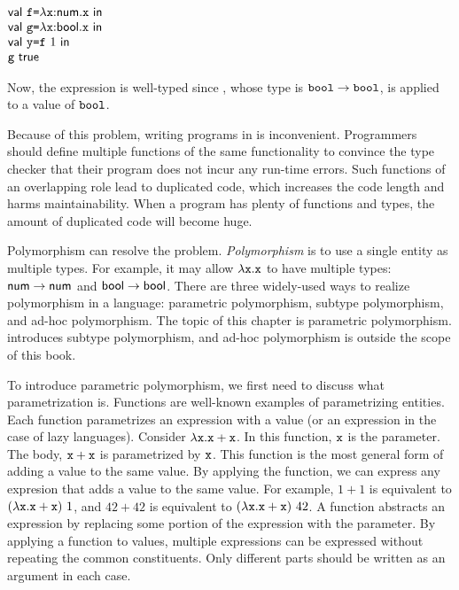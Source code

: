 $
  \begin{array}{@{}l}
    \ebind{\cf}{\efunt{\cx}{\tnum}{\cx}}{\\
    \ebind{\code{g}}{\efunt{\cx}{\tbool}{\cx}}{\\
    \ebind{\cy}{\cf\ 1}{\\
    \code{g}\ \textsf{true}
    }}}
  \end{array}
$

Now, the expression is well-typed since , whose type is
$\texttt{bool}\rightarrow\texttt{bool}$, is applied to a value of $\texttt{bool}$.

Because of this problem, writing programs in \plang is inconvenient. Programmers
should define multiple functions of the same functionality to convince the type
checker that their program does not incur any run-time errors. Such functions of
an overlapping role lead to duplicated code, which increases the code length and
harms maintainability. When a program has plenty of functions and types, the
amount of duplicated code will become huge.

Polymorphism can resolve the problem. \textit{Polymorphism}
is to use a single entity as multiple types. For example, it may allow
$\lambda\texttt{x}.\texttt{x}$ to have multiple types: $\textsf{num}\rightarrow\textsf{num}$ and
$\textsf{bool}\rightarrow\textsf{bool}$. There are three widely-used ways to
realize polymorphism in a language: parametric polymorphism, subtype
polymorphism, and ad-hoc polymorphism. The topic of this chapter is parametric
polymorphism.  introduces subtype polymorphism, and
ad-hoc polymorphism is outside the scope of this book.

To introduce parametric polymorphism, we first need to discuss what
parametrization is. Functions are well-known examples of parametrizing entities.
Each function parametrizes an expression with a value
(or an expression in the case of lazy languages). Consider $\lambda\texttt{x}.\texttt{x}+\texttt{x}$.
In this function, $\texttt{x}$ is the parameter. The body, $\texttt{x}+\texttt{x}$ is parametrized by $\texttt{x}$.
This function is the most general form of adding a value to the same value. By
applying the function, we can express any expresion that adds a value to the
same value. For example, $1+1$ is equivalent to $(\efun{\cx}{\cx+\cx})\ 1$, and
$42+42$ is equivalent to $(\efun{\cx}{\cx+\cx})\ 42$. A function abstracts an
expression by replacing some portion of the expression with the parameter. By
applying a function to values, multiple expressions can be
expressed without repeating the common constituents. Only different parts should
be written as an argument in each case.


